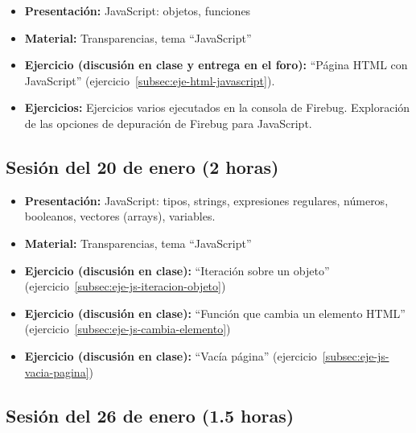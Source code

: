 \documentclass[a4paper,12pt]{report}
\begin{document}
\begin{itemize}
\item \textbf{Presentación:} JavaScript: objetos, funciones
\item \textbf{Material:} Transparencias, tema ``JavaScript''
\item \textbf{Ejercicio (discusión en clase y entrega en el foro):} ``Página HTML con JavaScript'' (ejercicio~\ref{subsec:eje-html-javascript}).
\item \textbf{Ejercicios:} Ejercicios varios ejecutados en la consola de Firebug. Exploración de las opciones de depuración de Firebug para JavaScript.
\end{itemize}

\subsection{Sesión del 20 de enero (2 horas)}

\begin{itemize}
\item \textbf{Presentación:} JavaScript: tipos, strings, expresiones regulares, números, booleanos, vectores (arrays), variables.
\item \textbf{Material:} Transparencias, tema ``JavaScript''
\item \textbf{Ejercicio (discusión en clase):} ``Iteración sobre un objeto'' (ejercicio~\ref{subsec:eje-js-iteracion-objeto})
\item \textbf{Ejercicio (discusión en clase):} ``Función que cambia un elemento HTML'' (ejercicio~\ref{subsec:eje-js-cambia-elemento})
\item \textbf{Ejercicio (discusión en clase):} ``Vacía página'' (ejercicio~\ref{subsec:eje-js-vacia-pagina})
\end{itemize}


\subsection{Sesión del 26 de enero (1.5 horas)}
\end{document}
